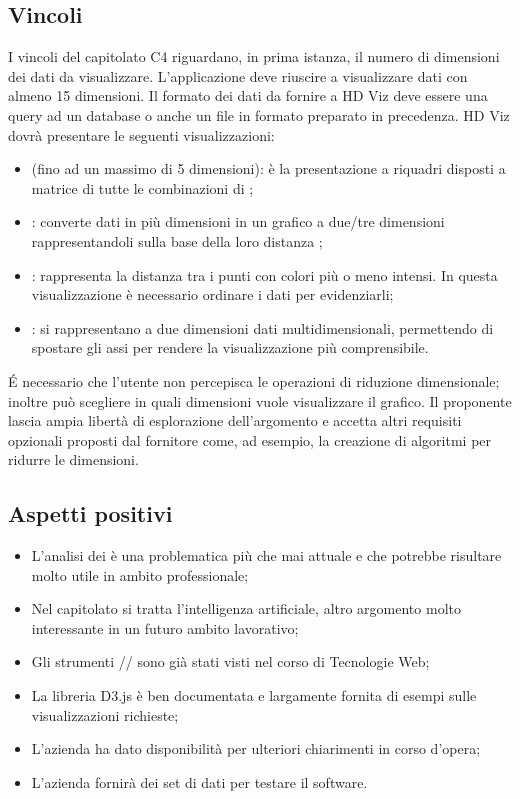 \subsection{Vincoli}
I vincoli del capitolato C4 riguardano, in prima istanza, il numero di dimensioni dei dati da visualizzare. L'applicazione deve riuscire a visualizzare dati con almeno 15 dimensioni. 
Il formato dei dati da fornire a HD Viz deve essere una query ad un database o anche un file in formato  preparato in precedenza.
HD Viz dovrà presentare le seguenti visualizzazioni: 
\begin{itemize}
\item \textbf{} (fino ad un massimo di 5 dimensioni): è la presentazione a riquadri disposti a matrice di tutte le combinazioni di ; 
\item \textbf{}: converte dati in più dimensioni in un grafico a due/tre dimensioni rappresentandoli sulla base della loro distanza ; 
\item \textbf{}: rappresenta la distanza tra i punti con colori più o meno intensi. In questa visualizzazione è necessario ordinare i dati per evidenziarli; 
\item \textbf{}: si rappresentano a due dimensioni dati multidimensionali, permettendo di spostare gli assi per rendere la visualizzazione più comprensibile.  
\end{itemize} 
\'E necessario che l'utente non percepisca le operazioni di riduzione dimensionale; inoltre può scegliere in quali dimensioni vuole visualizzare il grafico.
Il proponente lascia ampia libertà di esplorazione dell'argomento e accetta altri requisiti opzionali proposti dal fornitore come, ad esempio, la creazione di algoritmi per ridurre le dimensioni.

\subsection{Aspetti positivi}
\begin{itemize}
\item L'analisi dei  è una problematica più che mai attuale e che potrebbe risultare molto utile in ambito professionale;
\item Nel capitolato si tratta l'intelligenza artificiale, altro argomento molto interessante in un futuro ambito lavorativo;
\item Gli strumenti // sono già stati visti nel corso di Tecnologie Web;
\item La libreria D3.js è ben documentata e largamente fornita di esempi sulle visualizzazioni richieste;
\item L'azienda ha dato disponibilità per ulteriori chiarimenti in corso d'opera;
\item L'azienda fornirà dei set di dati per testare il software.
\end{itemize}

